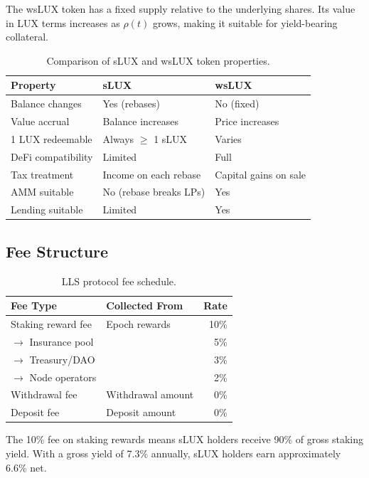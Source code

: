 \documentclass[11pt,a4paper]{article}
\begin{document}
The wsLUX token has a fixed supply relative to the underlying shares. Its value in LUX terms increases as $\rho(t)$ grows, making it suitable for yield-bearing collateral.

\begin{table}[H]
\centering
\caption{Comparison of sLUX and wsLUX token properties.}
\label{tab:token_comparison}
\begin{tabular}{lll}
\toprule
\textbf{Property} & \textbf{sLUX} & \textbf{wsLUX} \\
\midrule
Balance changes & Yes (rebases) & No (fixed) \\
Value accrual & Balance increases & Price increases \\
1 LUX redeemable & Always $\geq$ 1 sLUX & Varies \\
DeFi compatibility & Limited & Full \\
Tax treatment & Income on each rebase & Capital gains on sale \\
AMM suitable & No (rebase breaks LPs) & Yes \\
Lending suitable & Limited & Yes \\
\bottomrule
\end{tabular}
\end{table}

\subsection{Fee Structure}

\begin{table}[H]
\centering
\caption{LLS protocol fee schedule.}
\label{tab:fees}
\begin{tabular}{llr}
\toprule
\textbf{Fee Type} & \textbf{Collected From} & \textbf{Rate} \\
\midrule
Staking reward fee & Epoch rewards & 10\% \\
\quad$\to$ Insurance pool & & 5\% \\
\quad$\to$ Treasury/DAO & & 3\% \\
\quad$\to$ Node operators & & 2\% \\
Withdrawal fee & Withdrawal amount & 0\% \\
Deposit fee & Deposit amount & 0\% \\
\bottomrule
\end{tabular}
\end{table}

The 10\% fee on staking rewards means sLUX holders receive 90\% of gross staking yield. With a gross yield of 7.3\% annually, sLUX holders earn approximately 6.6\% net.
\end{document}
